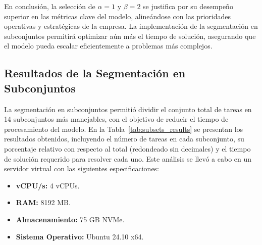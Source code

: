 \documentclass{article}
\begin{document}
En conclusión, la selección de \( \alpha = 1 \) y \( \beta = 2 \) se justifica por su desempeño superior en las métricas clave del modelo, alineándose con las prioridades operativas y estratégicas de la empresa. La implementación de la segmentación en subconjuntos permitirá optimizar aún más el tiempo de solución, asegurando que el modelo pueda escalar eficientemente a problemas más complejos.



\subsection{Resultados de la Segmentación en Subconjuntos}

La segmentación en subconjuntos permitió dividir el conjunto total de tareas en 14 subconjuntos más manejables, con el objetivo de reducir el tiempo de procesamiento del modelo. En la Tabla~\ref{tab:subsets_results} se presentan los resultados obtenidos, incluyendo el número de tareas en cada subconjunto, su porcentaje relativo con respecto al total (redondeado sin decimales) y el tiempo de solución requerido para resolver cada uno. Este análisis se llevó a cabo en un servidor virtual con las siguientes especificaciones:  

\begin{itemize}
    \item \textbf{vCPU/s:} 4 vCPUs.
    \item \textbf{RAM:} 8192 MB.
    \item \textbf{Almacenamiento:} 75 GB NVMe.
    \item \textbf{Sistema Operativo:} Ubuntu 24.10 x64.
\end{itemize}
\end{document}
